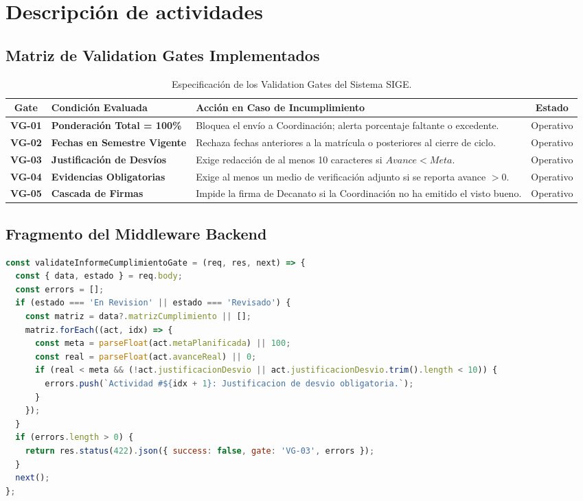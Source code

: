 \documentclass[12pt,a4paper]{article}
\begin{document}
\section{Descripción de actividades}

\subsection{Matriz de Validation Gates Implementados}

\begin{table}[htbp]
\centering
\small
\renewcommand{\arraystretch}{1.25}
\begin{tabularx}{\textwidth}{|c|>{\raggedright\arraybackslash\bfseries}m{3.2cm}|X|c|}
\hline
\rowcolor{tableheader}
\textbf{Gate} & \textbf{Condición Evaluada} & \textbf{Acción en Caso de Incumplimiento} & \textbf{Estado} \\
\hline
\textbf{VG-01} & Ponderación Total = 100\% & Bloquea el envío a Coordinación; alerta porcentaje faltante o excedente. & Operativo \\
\hline
\textbf{VG-02} & Fechas en Semestre Vigente & Rechaza fechas anteriores a la matrícula o posteriores al cierre de ciclo. & Operativo \\
\hline
\textbf{VG-03} & Justificación de Desvíos & Exige redacción de al menos 10 caracteres si $Avance < Meta$. & Operativo \\
\hline
\textbf{VG-04} & Evidencias Obligatorias & Exige al menos un medio de verificación adjunto si se reporta avance $> 0$. & Operativo \\
\hline
\textbf{VG-05} & Cascada de Firmas & Impide la firma de Decanato si la Coordinación no ha emitido el visto bueno. & Operativo \\
\hline
\end{tabularx}
\caption{Especificación de los Validation Gates del Sistema SIGE.}
\end{table}

\subsection{Fragmento del Middleware Backend}
\begin{lstlisting}[language=JavaScript, caption={Fragmento de código del middleware validationGates.js}]
const validateInformeCumplimientoGate = (req, res, next) => {
  const { data, estado } = req.body;
  const errors = [];
  if (estado === 'En Revision' || estado === 'Revisado') {
    const matriz = data?.matrizCumplimiento || [];
    matriz.forEach((act, idx) => {
      const meta = parseFloat(act.metaPlanificada) || 100;
      const real = parseFloat(act.avanceReal) || 0;
      if (real < meta && (!act.justificacionDesvio || act.justificacionDesvio.trim().length < 10)) {
        errors.push(`Actividad #${idx + 1}: Justificacion de desvio obligatoria.`);
      }
    });
  }
  if (errors.length > 0) {
    return res.status(422).json({ success: false, gate: 'VG-03', errors });
  }
  next();
};
\end{lstlisting}
\end{document}
